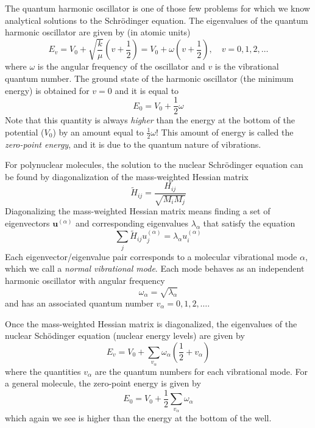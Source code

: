 \documentclass[../Main/notes.tex]{subfiles}
\begin{document}
The quantum harmonic oscillator is one of those few problems for which we know analytical solutions to the Schr\"{o}dinger equation.
The eigenvalues of the quantum harmonic oscillator are given by (in atomic units)
\begin{equation}
E_v = V_0 + \sqrt{\frac{k}{\mu}} \left(v + \frac{1}{2}\right)
= V_0 +  \omega \left(v + \frac{1}{2}\right), \quad v = 0,1,2,\ldots
\end{equation}
where $\omega$ is the angular frequency of the oscillator and $v$ is the vibrational quantum number.
The ground state of the harmonic oscillator (the minimum energy) is obtained for $v = 0$ and it is equal to
\begin{equation}
E_0 = V_0 +  \frac{1}{2}\omega
\end{equation}
Note that this quantity is always \emph{higher} than the energy at the bottom of the potential ($V_0$) by an amount equal to $\frac{1}{2}\omega$!
This amount of energy is called the \emph{zero-point energy}, and it is due to the quantum nature of vibrations.

For polynuclear molecules, the solution to the nuclear Schr\"{o}dinger equation can be found by diagonalization of the mass-weighted Hessian matrix
\begin{equation}
\tilde{H}_{ij} = \frac{H_{ij}}{\sqrt{M_i M_j}}
\end{equation}
Diagonalizing the mass-weighted Hessian matrix means finding a set of eigenvectors $\mathbf{u}^{(\alpha)}$ and corresponding eigenvalues $\lambda_\alpha$ that satisfy the equation
\begin{equation}
\sum_{j} \tilde{H}_{ij} u^{(\alpha)}_{j} = \lambda_\alpha u^{(\alpha)}_{i}
\end{equation}
Each eigenvector/eigenvalue pair corresponds to a molecular vibrational mode $\alpha$, which we call a \emph{normal vibrational mode}.
Each mode behaves as an independent harmonic oscillator with angular frequency
\begin{equation}
\omega_\alpha = \sqrt{\lambda_\alpha}
\end{equation}
and has an associated quantum number $v_\alpha = 0, 1, 2, \ldots$.

Once the mass-weighted Hessian matrix is diagonalized, the eigenvalues of the nuclear Sch\"{o}dinger equation (nuclear energy levels) are given by
\begin{equation}
E_v = V_0 + \sum_{v_\alpha} \omega_\alpha \left(\frac{1}{2} + v_\alpha\right)
\end{equation}
where the quantities $v_\alpha$ are the quantum numbers for each vibrational mode.
For a general molecule, the zero-point energy is given by
\begin{equation}
E_0 = V_0 + \frac{1}{2}  \sum_{v_\alpha} \omega_\alpha
\end{equation}
which again we see is higher than the energy at the bottom of the well.
\end{document}
